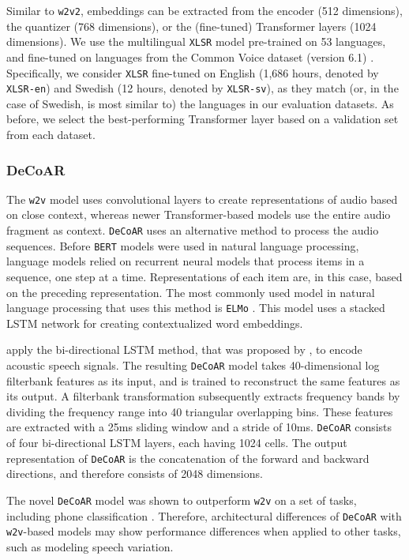 \documentclass[11pt,a4paper]{article}
\begin{document}
Similar to \texttt{w2v2}, embeddings can be extracted from the encoder (512 dimensions), the quantizer (768 dimensions), or the (fine-tuned) Transformer layers (1024 dimensions).
We use the multilingual \texttt{XLSR} model pre-trained on 53 languages, and fine-tuned on languages from the Common Voice dataset (version 6.1) \citep{ardila2019common}.
Specifically, we consider \texttt{XLSR} fine-tuned on English (1,686 hours, denoted by \texttt{XLSR-en}) and Swedish (12 hours, denoted by \texttt{XLSR-sv}), as they match (or, in the case of Swedish, is most similar to) the languages in our evaluation datasets. As before, we select the best-performing Transformer layer based on a validation set from each dataset.

\subsubsection{DeCoAR} 
The \texttt{w2v} model uses convolutional layers to create representations of audio based on close context, whereas newer Transformer-based models use the entire audio fragment as context.
\texttt{DeCoAR} uses an alternative method to process the audio sequences.
Before \texttt{BERT} models were used in natural language processing, language models relied on recurrent neural models that process items in a sequence, one step at a time.
Representations of each item are, in this case, based on the preceding representation.
The most commonly used model in natural language processing that uses this method is \texttt{ELMo} \citep{petersDeepContextualizedWord2018}.
This model uses a stacked LSTM network for creating contextualized word embeddings.

\citet{ling2020deep} apply the bi-directional LSTM method, that was proposed by \citet{petersDeepContextualizedWord2018}, to encode acoustic speech signals.
The resulting \texttt{DeCoAR} model takes 40-dimensional log filterbank features as its input, and is trained to reconstruct the same features as its output.
A filterbank transformation subsequently extracts frequency bands by dividing the frequency range into 40 triangular overlapping bins.
These features are extracted with a 25ms sliding window and a stride of 10ms.
\texttt{DeCoAR} consists of four bi-directional LSTM layers, each having 1024 cells.
The output representation of \texttt{DeCoAR} is the concatenation of the forward and backward directions, and therefore consists of 2048 dimensions.

The novel \texttt{DeCoAR} model was shown to outperform \texttt{w2v} on a set of tasks, including phone classification \citep{ma:21}.
Therefore, architectural differences of \texttt{DeCoAR} with \texttt{w2v}-based models may show performance differences when applied to other tasks, such as modeling speech variation.
\newpage
\end{document}
